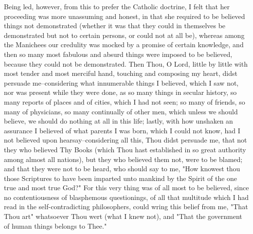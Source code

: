 \documentclass[b5paper,openright,12pt,twoside]{book}
\begin{document}
Being led, however, from this to prefer the Catholic doctrine, I felt
that her proceeding was more unassuming and honest, in that she required
to be believed things not demonstrated (whether it was that they could
in themselves be demonstrated but not to certain persons, or could not
at all be), whereas among the Manichees our credulity was mocked by a
promise of certain knowledge, and then so many most fabulous and
absurd things were imposed to be believed, because they could not be
demonstrated. Then Thou, O Lord, little by little with most tender and
most merciful hand, touching and composing my heart, didst persuade
me--considering what innumerable things I believed, which I saw not, nor
was present while they were done, as so many things in secular history,
so many reports of places and of cities, which I had not seen; so many
of friends, so many of physicians, so many continually of other men,
which unless we should believe, we should do nothing at all in this
life; lastly, with how unshaken an assurance I believed of what
parents I was born, which I could not know, had I not believed upon
hearsay--considering all this, Thou didst persuade me, that not they who
believed Thy Books (which Thou hast established in so great authority
among almost all nations), but they who believed them not, were to be
blamed; and that they were not to be heard, who should say to me, "How
knowest thou those Scriptures to have been imparted unto mankind by the
Spirit of the one true and most true God?" For this very thing was
of all most to be believed, since no contentiousness of blasphemous
questionings, of all that multitude which I had read in the
self-contradicting philosophers, could wring this belief from me,
"That Thou art" whatsoever Thou wert (what I knew not), and "That the
government of human things belongs to Thee."
\end{document}
